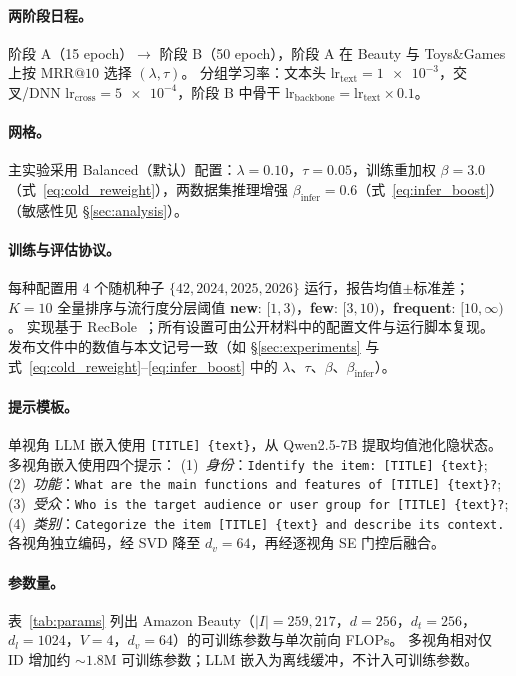 \documentclass[sigconf,natbib=true,anonymous]{acmart}
\newcommand{\llm}{\textsc{LLM}\xspace}
\begin{document}
\paragraph{两阶段日程。}
阶段 A（15 epoch）$\rightarrow$ 阶段 B（50 epoch），阶段 A 在 Beauty 与 Toys\&Games 上按 $\mathrm{MRR@10}$ 选择 $(\lambda,\tau)$。
分组学习率：文本头 $\text{lr}_{\text{text}}=\num{1e-3}$，交叉/DNN $\text{lr}_{\text{cross}}=\num{5e-4}$，阶段 B 中骨干 $\text{lr}_{\text{backbone}}=\text{lr}_{\text{text}}\times 0.1$。
\paragraph{网格。}
主实验采用 Balanced（默认）配置：$\lambda=0.10$，$\tau=0.05$，训练重加权 $\beta=3.0$（式~\eqref{eq:cold_reweight}），两数据集推理增强 $\beta_{\text{infer}}=0.6$（式~\eqref{eq:infer_boost}）（敏感性见 \S\ref{sec:analysis}）。
\paragraph{训练与评估协议。}
每种配置用 4 个随机种子 $\{42, 2024, 2025, 2026\}$ 运行，报告均值$\pm$标准差；$K{=}10$ 全量排序与流行度分层阈值 \textbf{new}: $[1,3)$，\textbf{few}: $[3,10)$，\textbf{frequent}: $[10,\infty)$。
实现基于 RecBole~\cite{zhao2021recbole}；所有设置可由公开材料中的配置文件与运行脚本复现。
发布文件中的数值与本文记号一致（如 \S\ref{sec:experiments} 与式~\eqref{eq:cold_reweight}--\eqref{eq:infer_boost} 中的 $\lambda$、$\tau$、$\beta$、$\beta_{\text{infer}}$）。
\paragraph{提示模板。}
单视角 \llm 嵌入使用 \texttt{[TITLE] \{text\}}，从 Qwen2.5-7B 提取均值池化隐状态。
多视角嵌入使用四个提示：
(1)~\emph{身份}：\texttt{Identify the item: [TITLE] \{text\}};
(2)~\emph{功能}：\texttt{What are the main functions and features of [TITLE] \{text\}?};
(3)~\emph{受众}：\texttt{Who is the target audience or user group for [TITLE] \{text\}?};
(4)~\emph{类别}：\texttt{Categorize the item [TITLE] \{text\} and describe its context.}
各视角独立编码，经 SVD 降至 $d_v{=}64$，再经逐视角 SE 门控后融合。

\paragraph{参数量。}
表~\ref{tab:params} 列出 Amazon Beauty（$|I|{=}259{,}217$，$d{=}256$，$d_t{=}256$，$d_l{=}1024$，$V{=}4$，$d_v{=}64$）的可训练参数与单次前向 FLOPs。
多视角相对仅 ID 增加约 ${\sim}1.8$M 可训练参数；\llm 嵌入为离线缓冲，不计入可训练参数。
\end{document}
